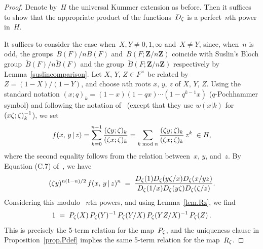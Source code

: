 \documentclass[12pt,reqno]{amsart}
\theoremstyle{definition}
\newcommand{\newfrankchanged}[1]{{#1}}
\def\BB{\widetilde{B}}
\def\+{\,+\,}
\def\={\;=\;}
\def\mod{\;\text{\rm mod}\;}
\def\Z{\mathbf Z}   %
\def\nn{n}
\begin{document}
\begin{proof}
Denote by~$H$ the universal Kummer extension as before.  Then it
suffices to show that the appropriate product of the functions~$D_\zeta$ is 
a perfect~$\nn$th power in~$H$. 

\newfrankchanged{It suffices to consider the case when~$X, Y \ne 0,1,\infty$
and~$X \ne Y$,
since, when~$\nn$ is odd, the groups~$B(F)/\nn B(F)$ and~$B(F;\Z/\nn \Z)$ coincide
with Suslin's Bloch group~$\BB(F)/\nn \BB(F)$  and the group~$\BB(F;\Z/\nn\Z)$ respectively  by Lemma~\ref{suslincomparison}.}
Let $X,\,Y,\,Z\in F^\times$ be related by $Z=(1-X)/(1-Y)$, and choose
$\nn$th roots $x,\,y,\,z$ of $X,\,Y,\,Z$.
Using the standard notation $(x;q)_k=(1-x)(1-qx)\cdots(1-q^{k-1}x)$ 
($q$-Pochhammer symbol) and following the notation of~\cite{KMS} 
(except that they use $w(x|k)$ for $(x\zeta;\zeta)_k^{-1}$), we set
$$
f(x,\,y\,|\,z) = \sum_{k=0}^{\nn-1} \frac{(\z y;\z)_k}{(\z x;\z)_k} 
= \sum_{k \mod n} \frac{(\z y;\z)_k}{(\z x;\z)_k}\, 
z^k\;\in H,
$$
where the second equality follows from the relation between~$x$, $y$, and~$z$. 
By Equation (C.7) of~\cite{KMS}, we have
$$
(\z y)^{\nn(1-\nn)/2} \, f(x,\,y\,|\,z)^\nn 
\= \frac{D_\z(1) D_\z(y \z/x) D_\z(x/y z)}
{D_\z(1/x) D_\z(y \z) D_\z(\z/z)}.
$$
Considering this modulo ~$\nn$th powers, 
and using 
Lemma~\ref{lem.Rz}, we find
$$ 
1 \= P_\z(X)\,P_\z(Y)\i\,P_\z(Y/X)\,P_\z(YZ/X)\i\,P_\z(Z)\,.
$$
This is precisely the 5-term relation for the map~$P_\zeta$, and the 
uniqueness clause in Proposition~\ref{prop.Pdef} implies the same 5-term 
relation for the map~$R_\zeta$.
\end{proof}
\end{document}
